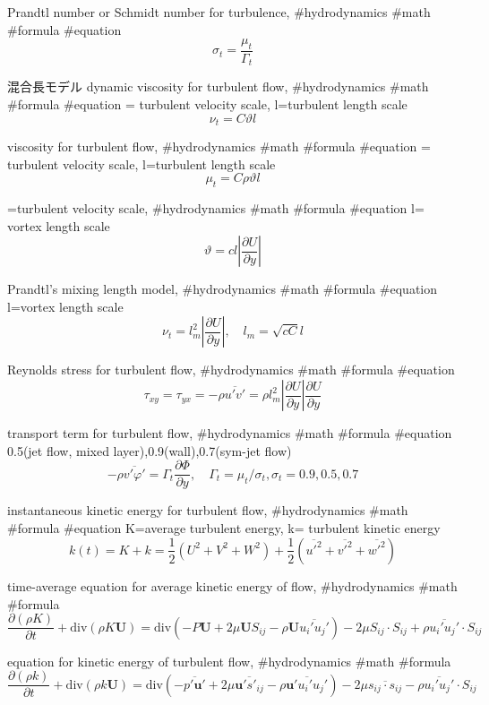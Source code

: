 Prandtl number or Schmidt number for turbulence, #hydrodynamics #math #formula #equation
$$
\sigma_t=\frac{\mu_t}{\Gamma_t}
$$

混合長モデル
dynamic viscosity for turbulent flow, #hydrodynamics #math #formula #equation
\vartheta= turbulent velocity scale, l=turbulent length scale
$$
\nu_t=C \vartheta l
$$

viscosity for turbulent flow, #hydrodynamics #math #formula #equation
\vartheta= turbulent velocity scale, l=turbulent length scale
$$
\mu_t=C \rho \vartheta l
$$

\vartheta=turbulent velocity scale, #hydrodynamics #math #formula #equation
l= vortex length scale
$$
\vartheta=c l \left|\frac{\partial U}{\partial y}\right|
$$

Prandtl’s mixing length model, #hydrodynamics #math #formula #equation
l=vortex length scale
$$
\nu_t=l_m^2 \left|\frac{\partial U}{\partial y}\right|, \quad l_m=\sqrt{c C} l
$$

Reynolds stress for turbulent flow, #hydrodynamics #math #formula #equation
$$
\tau_{xy}=\tau_{yx}=-\rho \overline{u' v'}=\rho l_m^2 \left|\frac{\partial U}{\partial y}\right|\frac{\partial U}{\partial y}
$$

transport term for turbulent flow, #hydrodynamics #math #formula #equation
0.5(jet flow, mixed layer),0.9(wall),0.7(sym-jet flow)
$$
-\rho \overline{v'\varphi'}=\Gamma_t\frac{\partial \Phi}{\partial y}, \quad \Gamma_t=\mu_t/\sigma_t, \sigma_t=0.9,0.5,0.7
$$

instantaneous kinetic energy for turbulent flow, #hydrodynamics #math #formula #equation
K=average turbulent energy, k= turbulent kinetic energy
$$
k(t)=K+k=\frac{1}{2}(U^2+V^2+W^2)+\frac{1}{2}\left(\overline{u'^2}+\overline{v'^2}+\overline{w'^2}\right)
$$

time-average equation for average kinetic energy of flow, #hydrodynamics #math #formula
$$
\frac{\partial(\rho K)}{\partial t}+\mathrm{div}(\rho K \boldsymbol{U})=\mathrm{div}(-P\boldsymbol{U}+2\mu\boldsymbol{U}S_{ij}-\rho\boldsymbol{U}\overline{u_i'u_j'})-2\mu S_{ij}\cdot S_{ij}+\rho\overline{u_i'u_j'}\cdot S_{ij}
$$

equation for kinetic energy of turbulent flow, #hydrodynamics #math #formula
$$
\frac{\partial(\rho k)}{\partial t}+\mathrm{div}(\rho k \boldsymbol{U})=\mathrm{div}(-\overline{p'\boldsymbol{u'}}+2\mu\overline{\boldsymbol{u}'s'_{ij}}-\rho\overline{\boldsymbol{u}'u_i'u_j'})-2\mu \overline{s_{ij}\cdot s_{ij}}-\rho\overline{u_i'u_j'}\cdot S_{ij}
$$

